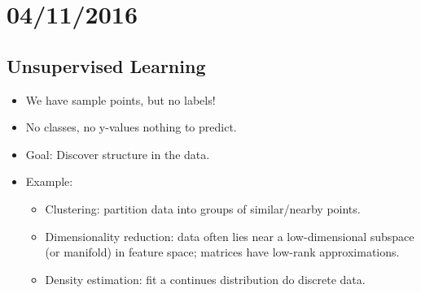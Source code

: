 \documentclass[10pt]{article}
\begin{document}
\section*{04/11/2016}

\subsection*{Unsupervised Learning}
	\begin{itemize}
		\item We have sample points, but no labels!
		\item No classes, no y-values nothing to predict.
		\item Goal: Discover structure in the data.
		\item Example:
			\begin{itemize}
				\item Clustering: partition data into groups of similar/nearby points.
				\item Dimensionality reduction: data often lies near a low-dimensional subspace (or manifold) in feature space; matrices have low-rank approximations.
				\item Density estimation: fit a continues distribution do discrete data.
			\end{itemize}
	\end{itemize}
	
\end{document}
